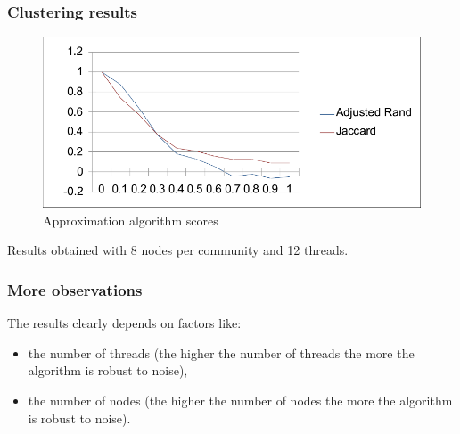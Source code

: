 \documentclass{beamer}
\begin{document}
\begin{frame}[c]
	\frametitle{Clustering results}

	\begin{figure}[htpb]
		\centering
		\includegraphics[width=0.8\linewidth]{out/synthetic_appr/scores.png}
		\caption{Approximation algorithm scores}%
		\label{fig:out/synthetic_appr/scores}
	\end{figure}

	Results obtained with 8 nodes per community and 12 threads.

\end{frame}

\begin{frame}[c]
	\frametitle{More observations}
	The results clearly depends on factors like:
	\begin{itemize}
		\item the number of threads (the higher the number of threads the more
		      the algorithm is robust to noise),
		\item the number of nodes (the higher the number of nodes the more
		      the algorithm is robust to noise).
	\end{itemize}
\end{frame}
%
%
\end{document}
